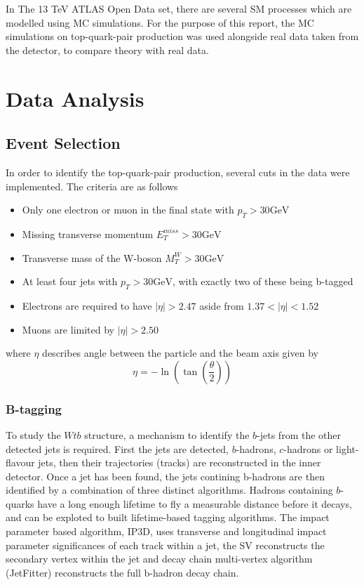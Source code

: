 \documentclass[12pt,a4paper]{article}
\begin{document}
In The 13 TeV ATLAS Open Data set, there are several SM processes which are
modelled using MC simulations. For the purpose of this report, the MC
simulations on top-quark-pair production was used alongside real data taken from
the detector, to compare theory with real data.

\section{Data Analysis}
\subsection{Event Selection}
\label{sec:cuts}
In order to identify the top-quark-pair production, several cuts in the data
were implemented. The criteria are as follows
\begin{itemize}
	\item Only one electron or muon in the final state with $p_{T} > 30 \mathrm{GeV}$
	\item Missing transverse momentum $E_{T}^{miss} > 30 \mathrm{GeV}$
	\item Transverse mass of the W-boson $M_{T}^{W} > 30 \mathrm{GeV}$
	\item At least four jets with $p_{T} > 30 \mathrm{GeV}$, with exactly two of these being b-tagged
	\item Electrons are required to have $|\eta| > 2.47$ aside from $1.37 < |\eta| < 1.52$
	\item Muons are limited by $|\eta| > 2.50$
\end{itemize}
where $\eta$ describes angle between the particle and the beam axis given by 
\begin{equation}
	\eta = -\ln({\tan\left(\frac{\theta}{2}\right)})
\end{equation}

\subsubsection{B-tagging}
To study the $Wtb$ structure, a mechanism to identify the $b$-jets from the
other detected jets is required. First the jets are detected, $b$-hadrons,
$c$-hadrons or light-flavour jets, then their trajectories (tracks) are
reconstructed in the inner detector. Once a jet has been found, the jets
contining b-hadrons are then identified by a combination of three distinct
algorithms. Hadrons containing $b$-quarks have a long enough lifetime to fly a
measurable distance before it decays, and can be exploted to built
lifetime-based tagging algorithms. The impact parameter based algorithm, IP3D,
uses transverse and longitudinal impact parameter significances of each track
within a jet, the SV reconstructs the secondary vertex within the jet and decay
chain multi-vertex algorithm (JetFitter) reconstructs the full b-hadron
decay chain.\\
\end{document}
